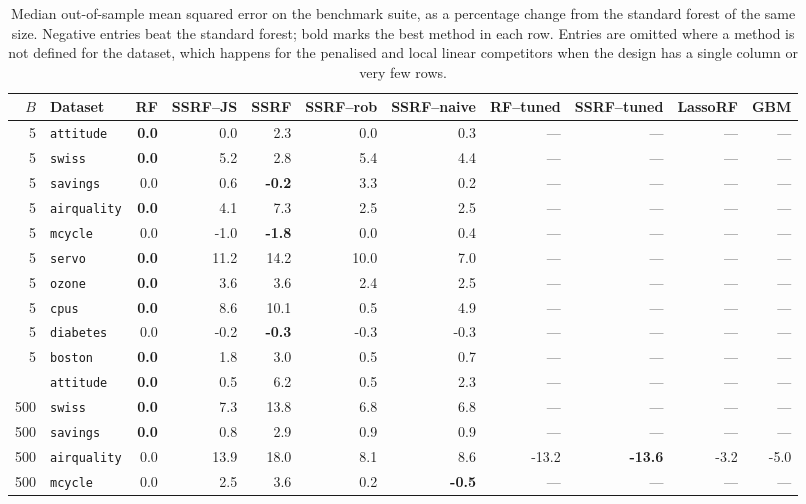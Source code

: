 \begin{table}[htbp]
\centering
\caption{Median out-of-sample mean squared error on the benchmark suite, as a percentage change from the standard forest of the same size. Negative entries beat the standard forest; bold marks the best method in each row. Entries are omitted where a method is not defined for the dataset, which happens for the penalised and local linear competitors when the design has a single column or very few rows.}
\label{tab:bench_methods}
\small
\setlength{\tabcolsep}{3pt}
\begin{tabular}{rlrrrrrrrrr}
\toprule
$B$ & Dataset & RF & SSRF--JS & SSRF & SSRF--rob & SSRF--naive & RF--tuned & SSRF--tuned & LassoRF & GBM \\
\midrule
5 & \texttt{attitude} & \textbf{0.0} & 0.0 & 2.3 & 0.0 & 0.3 & --- & --- & --- & --- \\
5 & \texttt{swiss} & \textbf{0.0} & 5.2 & 2.8 & 5.4 & 4.4 & --- & --- & --- & --- \\
5 & \texttt{savings} & 0.0 & 0.6 & \textbf{-0.2} & 3.3 & 0.2 & --- & --- & --- & --- \\
5 & \texttt{airquality} & \textbf{0.0} & 4.1 & 7.3 & 2.5 & 2.5 & --- & --- & --- & --- \\
5 & \texttt{mcycle} & 0.0 & -1.0 & \textbf{-1.8} & 0.0 & 0.4 & --- & --- & --- & --- \\
5 & \texttt{servo} & \textbf{0.0} & 11.2 & 14.2 & 10.0 & 7.0 & --- & --- & --- & --- \\
5 & \texttt{ozone} & \textbf{0.0} & 3.6 & 3.6 & 2.4 & 2.5 & --- & --- & --- & --- \\
5 & \texttt{cpus} & \textbf{0.0} & 8.6 & 10.1 & 0.5 & 4.9 & --- & --- & --- & --- \\
5 & \texttt{diabetes} & 0.0 & -0.2 & \textbf{-0.3} & -0.3 & -0.3 & --- & --- & --- & --- \\
5 & \texttt{boston} & \textbf{0.0} & 1.8 & 3.0 & 0.5 & 0.7 & --- & --- & --- & --- \\
\addlinespace
500 & \texttt{attitude} & \textbf{0.0} & 0.5 & 6.2 & 0.5 & 2.3 & --- & --- & --- & --- \\
500 & \texttt{swiss} & \textbf{0.0} & 7.3 & 13.8 & 6.8 & 6.8 & --- & --- & --- & --- \\
500 & \texttt{savings} & \textbf{0.0} & 0.8 & 2.9 & 0.9 & 0.9 & --- & --- & --- & --- \\
500 & \texttt{airquality} & 0.0 & 13.9 & 18.0 & 8.1 & 8.6 & -13.2 & \textbf{-13.6} & -3.2 & -5.0 \\
500 & \texttt{mcycle} & 0.0 & 2.5 & 3.6 & 0.2 & \textbf{-0.5} & --- & --- & --- & --- \\

\end{tabular}
\end{table}
